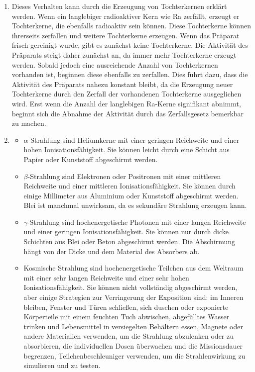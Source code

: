 \documentclass[11pt, a4paper]{article}
\begin{document}
\begin{enumerate}
        \item Dieses Verhalten kann durch die Erzeugung von Tochterkernen erklärt werden. Wenn ein langlebiger radioaktiver Kern wie Ra zerfällt, erzeugt er Tochterkerne, die ebenfalls radioaktiv sein können. Diese Tochterkerne können ihrerseits zerfallen und weitere Tochterkerne erzeugen.
        Wenn das Präparat frisch gereinigt wurde, gibt es zunächst keine Tochterkerne. Die Aktivität des Präparats steigt daher zunächst an, da immer mehr Tochterkerne erzeugt werden. Sobald jedoch eine ausreichende Anzahl von Tochterkernen vorhanden ist, beginnen diese ebenfalls zu zerfallen. Dies führt dazu, dass die Aktivität des Präparats nahezu konstant bleibt, da die Erzeugung neuer Tochterkerne durch den Zerfall der vorhandenen Tochterkerne ausgeglichen wird.
        Erst wenn die Anzahl der langlebigen Ra-Kerne signifikant abnimmt, beginnt sich die Abnahme der Aktivität durch das Zerfallsgesetz bemerkbar zu machen.
        \item \begin{itemize} \item $\alpha$-Strahlung sind Heliumkerne mit einer geringen Reichweite und einer hohen Ionisationsfähigkeit. Sie können leicht durch eine Schicht aus Papier oder Kunststoff abgeschirmt werden. \item $\beta$-Strahlung sind Elektronen oder Positronen mit einer mittleren Reichweite und einer mittleren Ionisationsfähigkeit. Sie können durch einige Millimeter aus Aluminium oder Kunststoff abgeschirmt werden. Blei ist manchmal unwirksam, da es sekundäre Strahlung erzeugen kann. \item $\gamma$-Strahlung sind hochenergetische Photonen mit einer langen Reichweite und einer geringen Ionisationsfähigkeit. Sie können nur durch dicke Schichten aus Blei oder Beton abgeschirmt werden. Die Abschirmung hängt von der Dicke und dem Material des Absorbers ab. \item Kosmische Strahlung sind hochenergetische Teilchen aus dem Weltraum mit einer sehr langen Reichweite und einer sehr hohen Ionisationsfähigkeit. Sie können nicht vollständig abgeschirmt werden, aber einige Strategien zur Verringerung der Exposition sind: im Inneren bleiben, Fenster und Türen schließen, sich duschen oder exponierte Körperteile mit einem feuchten Tuch abwischen, abgefülltes Wasser trinken und Lebensmittel in versiegelten Behältern essen, Magnete oder andere Materialien verwenden, um die Strahlung abzulenken oder zu absorbieren, die individuellen Dosen überwachen und die Missionsdauer begrenzen, Teilchenbeschleuniger verwenden, um die Strahlenwirkung zu simulieren und zu testen. \end{itemize}

\end{enumerate}
\end{document}
